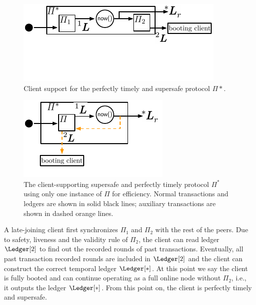   \ifccs
    \begin{figure}[b]
      \centering
      \includegraphics[width=1\columnwidth,keepaspectratio]{figures/perfectly-timely-clients.pdf}
      \caption{Client support for the perfectly timely and supersafe protocol $\Pi*$.
      }
    \label{fig:client-support}
    \end{figure}
  \fi

  \ifccs
    \begin{figure}[b]
    \centering
    \includegraphics[width=0.75\columnwidth,keepaspectratio]{figures/perfectly-timely-clients-feedback.pdf}
    \caption{The client-supporting supersafe and perfectly timely protocol $\Pi^*$
              using only one instance of $\Pi$ for efficiency.
              Normal transactions and ledgers are shown in solid black lines;
              auxiliary transactions are shown in dashed
              orange lines.}
    \label{fig:client-support-feedback}
    \end{figure}
  \fi

  A late-joining client first synchronizes $\Pi_1$ and $\Pi_2$ with the rest
  of the peers.
  Due to safety, liveness and the validity rule of $\Pi_2$,
  the client can read ledger $\Ledger[2]$ to find out the
  recorded rounds of past transactions.
  Eventually, all past transaction recorded rounds are included in $\Ledger[2]$
  and the client can construct the correct temporal ledger $\Ledger[*]$.
  At this point we say the client is fully booted and can continue
  operating as a full online node without $\Pi_2$, i.e., it outputs the ledger $\Ledger[*]$.
  From this point on, the client is perfectly timely and supersafe.

